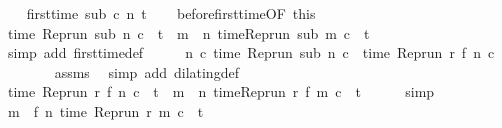 \begin{isabellebody}
\isanewline
\ \ \isamarkupfalse%
\ {\isacartoucheopen}first{\isacharunderscore}time\ sub\ c\ n\ t{\isacartoucheclose}\isanewline
\ \ \isamarkupfalse%
\ before{\isacharunderscore}first{\isacharunderscore}time{\isacharbrackleft}OF\ this{\isacharbrackright}\isanewline
\ \ \ \ \isamarkupfalse%
\ {\isacharasterisk}{\isacharcolon}{\isacartoucheopen}time\ {\isacharparenleft}{\isacharparenleft}Rep{\isacharunderscore}run\ sub{\isacharparenright}\ n\ c{\isacharparenright}\ {\isacharequal}\ t\ {\isasymand}\ {\isacharparenleft}{\isasymforall}m\ {\isacharless}\ n{\isachardot}\ time{\isacharparenleft}{\isacharparenleft}Rep{\isacharunderscore}run\ sub{\isacharparenright}\ m\ c{\isacharparenright}\ {\isacharless}\ t{\isacharparenright}{\isacartoucheclose}\isanewline
\ \ \ \ \ \ \isamarkupfalse%
\ {\isacharparenleft}simp\ add{\isacharcolon}\ first{\isacharunderscore}time{\isacharunderscore}def{\isacharparenright}\isanewline
\ \ \isamarkupfalse%
\ \isamarkupfalse%
\ {\isacartoucheopen}{\isasymforall}n\ c{\isachardot}\ time\ {\isacharparenleft}Rep{\isacharunderscore}run\ sub\ n\ c{\isacharparenright}\ {\isacharequal}\ time\ {\isacharparenleft}Rep{\isacharunderscore}run\ r\ {\isacharparenleft}f\ n{\isacharparenright}\ c{\isacharparenright}{\isacartoucheclose}\isanewline
\ \ \ \ \ \ \isamarkupfalse%
\ assms{\isacharparenleft}{}{\isacharparenright}\ \isamarkupfalse%
\ {\isacharparenleft}simp\ add{\isacharcolon}\ dilating{\isacharunderscore}def{\isacharparenright}\isanewline
\ \ \isamarkupfalse%
\ \isamarkupfalse%
\ {\isacharasterisk}{\isacharasterisk}{\isacharcolon}{\isacartoucheopen}time\ {\isacharparenleft}{\isacharparenleft}Rep{\isacharunderscore}run\ r{\isacharparenright}\ {\isacharparenleft}f\ n{\isacharparenright}\ c{\isacharparenright}\ {\isacharequal}\ t\ {\isasymand}\ {\isacharparenleft}{\isasymforall}m\ {\isacharless}\ n{\isachardot}\ time{\isacharparenleft}{\isacharparenleft}Rep{\isacharunderscore}run\ r{\isacharparenright}\ {\isacharparenleft}f\ m{\isacharparenright}\ c{\isacharparenright}\ {\isacharless}\ t{\isacharparenright}{\isacartoucheclose}\isanewline
\ \ \ \ \isamarkupfalse%
\ simp\isanewline
\ \ \isamarkupfalse%
\ {\isacartoucheopen}{\isasymforall}m\ {\isacharless}\ f\ n{\isachardot}\ time\ {\isacharparenleft}{\isacharparenleft}Rep{\isacharunderscore}run\ r{\isacharparenright}\ m\ c{\isacharparenright}\ {\isacharless}\ t{\isacartoucheclose}\isanewline

\end{isabellebody}
